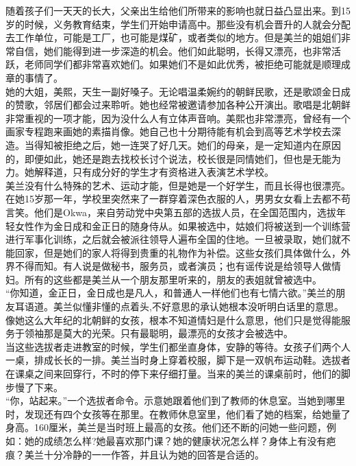 随着孩子们一天天的长大，父亲出生给他们所带来的影响也就日益凸显出来。到15岁的时候，义务教育结束，学生们开始申请高中。那些没有机会晋升的人就会分配去工作单位，可能是工厂，也可能是煤矿，或者类似的地方。但是美兰的姐姐们非常自信，她们能得到进一步深造的机会。他们如此聪明，长得又漂亮，也非常活跃，老师同学们都非常喜欢她们。如果她们不是如此优秀，被拒绝可能就是顺理成章的事情了。\\

她的大姐，美熙，天生一副好嗓子。无论唱温柔婉约的朝鲜民歌，还是歌颂金日成的赞歌，邻居们都会过来聆听。她也经常被邀请参加各种公开演出。歌唱是北朝鲜非常重视的一项才能，因为没什么人有立体声音响。美熙也非常漂亮，曾经有一个画家专程跑来画她的素描肖像。她自己也十分期待能有机会到高等艺术学校去深造。当得知被拒绝之后，她一连哭了好几天。她们的母亲，是一定知道内在原因的，即便如此，她还是跑去找校长讨个说法，校长很是同情她们，但也是无能为力。她解释道，只有成分好的学生才有资格进入表演艺术学校。\\

美兰没有什么特殊的艺术、运动才能，但是她是一个好学生，而且长得也很漂亮。在她15岁那一年，学校里突然来了一群穿着深色衣服的人，男男女女看上去都不苟言笑。他们是Okwa，来自劳动党中央第五部的选拔人员，在全国范围内，选拔年轻女性作为金日成和金正日的随身侍从。如果被选中，姑娘们将被送到一个训练营进行军事化训练，之后就会被派往领导人遍布全国的住地。一旦被录取，她们就不能回家，但是她们的家人将得到贵重的礼物作为补偿。这些女孩们具体做什么，外界不得而知。有人说是做秘书，服务员，或者演员；也有谣传说是给领导人做情妇。所有的这些都是美兰从一个朋友那里听来的，朋友的表姐就曾被选中。\\

“你知道，金正日，金日成也是凡人，和普通人一样他们也有七情六欲。”美兰的朋友耳语道。美兰似懂非懂的点着头,不好意思的承认她根本没听明白话里的意思。像她这么大年纪的北朝鲜的女孩，根本不知道情妇是什么意思，他们只是觉得能服务于领袖那是莫大的光荣。只有最聪明，最漂亮的女孩才会被选中。\\

当这些选拔者走进教室的时候，学生们都坐直身体，安静的等待。女孩子们两个人一桌，排成长长的一排。美兰当时身上穿着校服，脚下是一双帆布运动鞋。选拔者在课桌之间来回穿行，不时的停下来仔细打量。当来的美兰的课桌前时，他们的脚步慢了下来。\\

“你，站起来。”一个选拔者命令。示意她跟着他们到了教师的休息室。当她到哪里时，发现还有四个女孩等在那里。在教师休息室里，他们看了她的档案，给她量了身高。160厘米，美兰是当时班上最高的女孩。他们还不断的问她一些问题，例如：她的成绩怎么样?她最喜欢那门课？她的健康状况怎么样？身体上有没有疤痕？美兰十分冷静的一一作答，并且认为她的回答是合适的。\\

